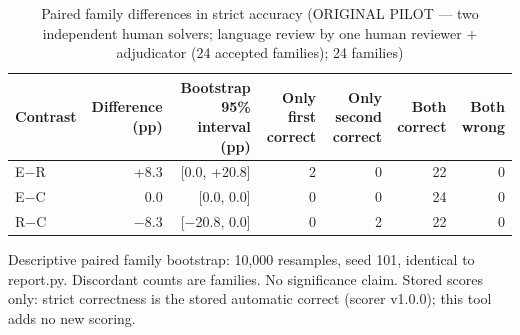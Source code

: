 \begin{table}[t]
\centering
\small
\caption{Paired family differences in strict accuracy (ORIGINAL PILOT --- two independent human solvers; language review by one human reviewer + adjudicator (24 accepted families); 24 families)}
\label{tab:pilotorig-Qwen3-4B-paired}
\begin{tabular}{lrrrrrr}
\toprule
Contrast & Difference (pp) & Bootstrap 95\% interval (pp) & Only first correct & Only second correct & Both correct & Both wrong \\
\midrule
E$-$R & +8.3 & [0.0, +20.8] & 2 & 0 & 22 & 0 \\
E$-$C & 0.0 & [0.0, 0.0] & 0 & 0 & 24 & 0 \\
R$-$C & $-$8.3 & [$-$20.8, 0.0] & 0 & 2 & 22 & 0 \\
\bottomrule
\end{tabular}
\par\smallskip
\parbox{\linewidth}{\footnotesize Descriptive paired family bootstrap: 10,000 resamples, seed 101, identical to report.py. Discordant counts are families. No significance claim. Stored scores only: strict correctness is the stored automatic correct (scorer v1.0.0); this tool adds no new scoring.}
\end{table}
